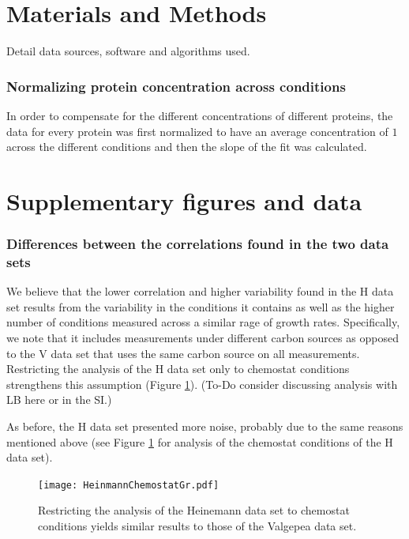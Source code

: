 \documentclass[notitlepage]{article}
\begin{document}
\section{Materials and Methods}
Detail data sources, software and algorithms used.
\subsubsection{Normalizing protein concentration across conditions}
\label{concacrossconds}
In order to compensate for the different concentrations of different proteins, the data for every protein was first normalized to have an average concentration of $1$ across the different conditions and then the slope of the fit was calculated.

\section{Supplementary figures and data}
\subsubsection{Differences between the correlations found in the two data sets}
\label{heinemannchemo}
We believe that the lower correlation and higher variability found in the H data set results from the variability in the conditions it contains as well as the higher number of conditions measured across a similar rage of growth rates.
Specifically, we note that it includes measurements under different carbon sources as opposed to the V data set that uses the same carbon source on all measurements.
Restricting the analysis of the H data set only to chemostat conditions strengthens this assumption (Figure \ref{fig:growthcorrchemo}).
(To-Do consider discussing analysis with LB here or in the SI.)

As before, the H data set presented more noise, probably due to the same reasons mentioned above (see Figure \ref{fig:growthcorrchemo} for analysis of the chemostat conditions of the H data set).

\begin{figure}[h]
\centering
\texttt{[image: HeinmannChemostatGr.pdf]}
\caption{
  Restricting the analysis of the Heinemann data set to chemostat conditions yields similar results to those of the Valgepea data set.
}
\label{fig:growthcorrchemo}
\end{figure}
\end{document}

